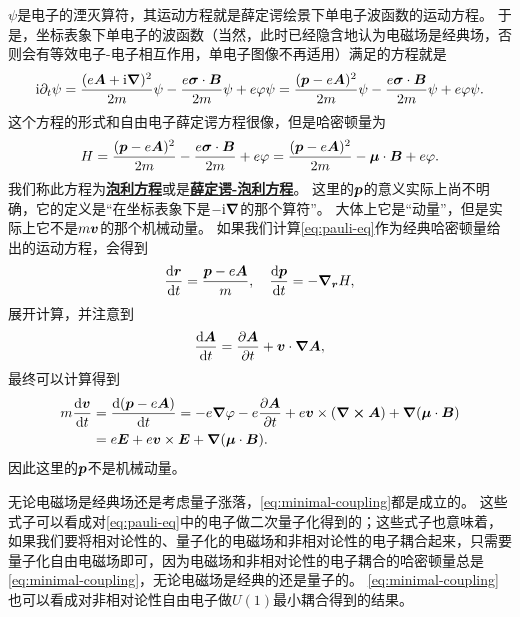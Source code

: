 \documentclass[hyperref, UTF8, a4paper]{ctexart}
\newcommand*{\ii}{\mathrm{i}}
\newcommand{\concept}[1]{\underline{\textbf{#1}}}
\begin{document}
$\psi$是电子的湮灭算符，其运动方程就是薛定谔绘景下单电子波函数的运动方程。
于是，坐标表象下单电子的波函数（当然，此时已经隐含地认为电磁场是经典场，否则会有等效电子-电子相互作用，单电子图像不再适用）满足的方程就是
\begin{equation}
    \ii \partial_t \psi = \frac{(e \vb*{A} + \ii \grad)^2}{2m} \psi - \frac{e \vb*{\sigma} \cdot \vb*{B}}{2m} \psi + e \varphi \psi = \frac{(\vb*{p} - e \vb*{A})^2}{2m} \psi - \frac{e \vb*{\sigma} \cdot \vb*{B}}{2m} \psi + e \varphi \psi.
\end{equation}
这个方程的形式和自由电子薛定谔方程很像，但是哈密顿量为
\begin{equation}
    H = \frac{(\vb*{p} - e \vb*{A})^2}{2m} - \frac{e \vb*{\sigma} \cdot \vb*{B}}{2m} + e \varphi = \frac{(\vb*{p} - e \vb*{A})^2}{2m} - \vb*{\mu} \cdot \vb*{B} + e \varphi.
    \label{eq:pauli-eq}
\end{equation}
我们称此方程为\concept{泡利方程}或是\concept{薛定谔-泡利方程}。
这里的$\vb*{p}$的意义实际上尚不明确，它的定义是“在坐标表象下是$-\ii \grad$的那个算符”。
大体上它是“动量”，但是实际上它不是$m \vb*{v}$的那个机械动量。
如果我们计算\eqref{eq:pauli-eq}作为经典哈密顿量给出的运动方程，会得到
\begin{equation}
    \dv{\vb*{r}}{t} = \frac{\vb*{p} - e \vb*{A}}{m}, \quad \dv{\vb*{p}}{t} = - \grad_{\vb*{r}}{H},
\end{equation}
展开计算，并注意到
\[
    \dv{\vb*{A}}{t} = \pdv{\vb*{A}}{t} + \vb*{v} \cdot \grad{\vb*{A}},
\]
最终可以计算得到
\begin{equation}
    \begin{aligned}
        m \dv{\vb*{v}}{t} &= \dv{(\vb*{p} - e \vb*{A})}{t} = - e \grad{\varphi} - e \pdv{\vb*{A}}{t} + e \vb*{v} \times (\curl{\vb*{A}}) + \grad(\vb*{\mu} \cdot \vb*{B}) \\
        &= e \vb*{E} + e \vb*{v} \times \vb*{E} + \grad(\vb*{\mu} \cdot \vb*{B}).
    \end{aligned}
    \label{eq:non-rel-electron-motion}
\end{equation}
因此这里的$\vb*{p}$不是机械动量。

无论电磁场是经典场还是考虑量子涨落，\eqref{eq:minimal-coupling}都是成立的。
这些式子可以看成对\eqref{eq:pauli-eq}中的电子做二次量子化得到的；这些式子也意味着，如果我们要将相对论性的、量子化的电磁场和非相对论性的电子耦合起来，只需要量子化自由电磁场即可，因为电磁场和非相对论性的电子耦合的哈密顿量总是\eqref{eq:minimal-coupling}，无论电磁场是经典的还是量子的。
\eqref{eq:minimal-coupling}也可以看成对非相对论性自由电子做$U(1)$最小耦合得到的结果。
\end{document}
